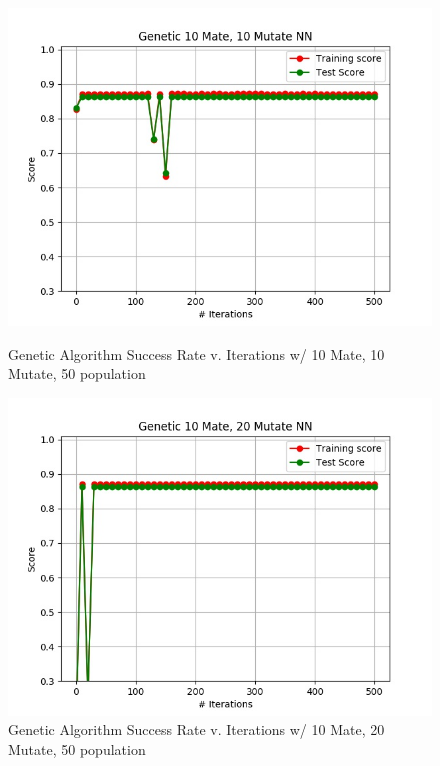 \documentclass[h]{article}
\begin{document}
  \begin{figure}[H]
      \includegraphics[width=1\textwidth,keepaspectratio]{genetic_10_mate,_10_mutate_nn.jpg} 
      \caption*{Genetic Algorithm Success Rate v. Iterations w/ 10 Mate, 10 Mutate,  50 population} 
   \endminipage\hfill
      \includegraphics[width=1\textwidth,keepaspectratio]{genetic_10_mate,_20_mutate_nn.jpg} 
      \caption*{Genetic Algorithm Success Rate v. Iterations w/ 10 Mate, 20 Mutate,  50 population} 
   \endminipage\hfill
\end{figure}
\end{document}
